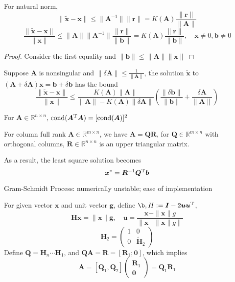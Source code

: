 \begin{theorem}
For natural norm,
\[
\|\tilde{\bm x}-\bm x\|\le\|\bm A^{-1}\|\|\bm r\|=K(\bm A)\frac{\|\bm r\|}{\|\bm A\|}
\]
\[
\frac{\|\tilde{\bm x}-\bm x\|}{\|\bm x\|}\le\|\bm A\|\|\bm A^{-1}\|\frac{\|\bm r\|}{\|\bm b\|}=K(\bm A)\frac{\|\bm r\|}{\|\bm b\|},\quad
\bm x\ne0,\bm b\ne0
\]
\end{theorem}
\begin{proof}
Consider the first equality and $\|\bm b\|\le\|\bm A\|\|\bm x\|$
\end{proof}

\begin{theorem}
Suppose $\bm A$ is nonsingular and $\|\delta\bm A\|\le\frac{1}{\|\bm A\|}$, the solution $\tilde{\bm x}$ to $(\bm A+\delta\bm A)\bm x=\bm b+\delta\bm b$ has the bound
\[
\frac{\|\tilde{\bm x}-\bm x\|}{\|\bm x\|}\le\frac{K(\bm A)\|\bm A\|}{\|\bm A\|-K(\bm A)\|\delta\bm A\|}\left(
\frac{\|\delta\bm b\|}{\|\bm b\|}+\frac{\delta\bm A}{\|\bm A\|}
\right)
\]
\end{theorem}
\begin{proposition}
For $\bm A\in\mathbb{R}^{n\times n}$, $\mbox{cond}(\bm A^{\mathrm T}\bm A)=[\mbox{cond}(\bm A)]^2$
\end{proposition}
\begin{theorem}
For column full rank $\bm A\in\mathbb{R}^{m\times n}$, we have $\bm A=\bm Q\bm R$, for $\bm Q\in\mathbb{R}^{m\times n}$ with orthogonal columns, $\bm R\in\mathbb{R}^{n\times n}$ is an upper triangular matrix.

As a result, the least square solution becomes
\[
\bm x^*=\bm R^{-1}\bm Q^{\mathrm T}\bm b
\]
\end{theorem}
Gram-Schmidt Process: numerically unstable; ease of implementation
\begin{theorem}
For given vector $\bm x$ and unit vector $\bm g$, define $\b, H:=\bm I-2\bm u\bm u\trans$,
\[
\bm{Hx}=\|\bm x\|\bm g,\quad
\bm u=\frac{\bm x-\|\bm x\|g}{\|\bm x-\|\bm x\|g\|}
\]
\[
\bm H_2=\begin{pmatrix}
1&0\\0&\tilde{\bm H}_2
\end{pmatrix}
\]
Define $\bm Q=\bm H_n\cdots\bm H_1$, and $\bm Q\bm A=\bm R=[\bm R_1;\bm0]$, which implies
\[
\bm A=[\bm Q_1,\bm Q_2]\begin{pmatrix}
\bm R_1\\\bm0
\end{pmatrix}=\bm Q_1\bm R_1
\]
\end{theorem}

















